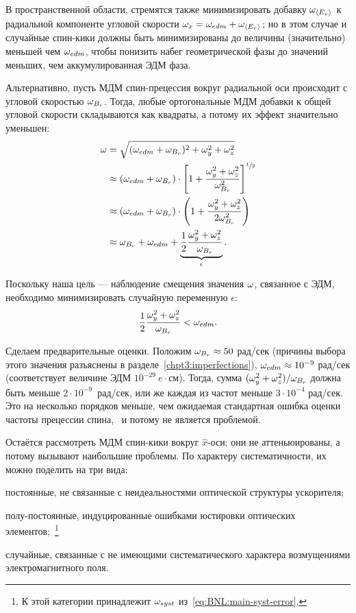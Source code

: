 В пространственной области, стремятся также минимизировать добавку $\wimp$ к радиальной компоненте
угловой скорости ${\w_x = \w_{edm} + \wimp}$; но в этом случае и случайные спин-кики должны быть 
минимизированы до величины (значительно) меньшей чем $\omega_{edm}$, чтобы понизить набег геометрической фазы
 до значений меньших, чем аккумулированная ЭДМ фаза. 

Альтернативно, пусть МДМ спин-прецессия вокруг радиальной оси происходит
с угловой скоростью $\omega_{B_r}$. Тогда, любые ортогональные
МДМ добавки к общей угловой скорости складываются как квадраты, а потому их эффект 
значительно уменьшен:
\begin{align*}
	\w &= \sqrt{(\wedm + \wsw)^2 + \w_y^2 + \w_z^2} \\
	&\approx (\wedm+\wsw)\cdot\bkt*{1 + \frac{\w_y^2 + \w_z^2}{\wsw^2}}^{\sfrac12} \\
	&\approx (\wedm + \wsw)\cdot \bkt{1 + \frac{\w_y^2 + \w_z^2}{2\wsw^2}} \\
	&\approx \wsw + \wedm + \underbrace{\frac12\frac{\w_y^2 + \w_z^2}{\wsw}}_{\epsilon}.
\end{align*}

Поскольку наша цель --- наблюдение смещения значения $\omega$, связанное с ЭДМ, необходимо 
минимизировать случайную переменную $\epsilon$:
\[
\frac12\frac{\omega_y^2+\omega_z^2}{\omega_{B_r}} < \omega_{edm}.
\]

Сделаем предварительные оценки. Положим $\omega_{B_r}\approx 50$ рад/сек (причины выбора этого значения
разъяснены в разделе~\ref{chpt3:imperfections}), $\omega_{edm}\approx 10^{-9}$ рад/сек (соответствует величине
ЭДМ $10^{-29}~e\cdot$см). Тогда, сумма $(\omega_y^2 + \omega_z^2)/\omega_{B_r}$ должна быть меньше 
${2\cdot 10^{-9}}$~рад/сек, или же каждая из частот меньше $3\cdot 10^{-4}$ рад/сек. 
Это на несколько порядков меньше, чем ожидаемая стандартная ошибка
оценки частоты прецессии спина,~\cite{Aksentev:Stats} и потому не является проблемой.

Остаётся рассмотреть МДМ спин-кики вокруг $\hat x$-оси; они не аттеньюированы, а потому
вызывают наибольшие проблемы. По характеру систематичности, их можно поделить на три вида: 
\begin{enumerate*}[(1)]
	\item постоянные, не связанные с неидеальностями оптической структуры ускорителя;
	\item полу-постоянные, индуцированные ошибками юстировки оптических элементов;~\footnote{К этой категории
		 принадлежит $\omega_{syst}$ из~\eqref{eq:BNL:main-syst-error}.
	}
	\item случайные, связанные с не имеющими систематического характера возмущениями электромагнитного поля.
\end{enumerate*}

